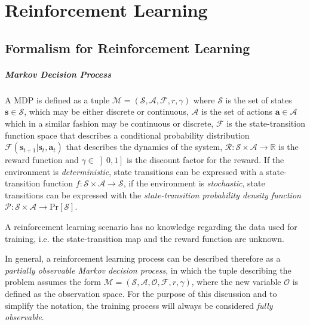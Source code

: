 \chapter{Reinforcement Learning}
\label{chp:04-ReinfLearning}

\section{Formalism for Reinforcement Learning}

\paragraph{Markov Decision Process} A \ac{MDP} is defined as a tuple $\mathcal{M} = (\mathcal{S}, \mathcal{A}, \mathcal{F}, r, \gamma)$ where $\mathcal{S}$ is the set of states $\mathbf{s} \in \mathcal{S}$, which may be either discrete or continuous, $\mathcal{A}$ is the set of actions $\mathbf{a} \in \mathcal{A}$ which in a similar fashion may be continuous or discrete, $\mathcal{F}$ is the state-transition function space that describes a conditional probability distribution $\mathcal{F}(\mathbf{s} _{t+1}|\mathbf{s}_t, \mathbf{a} _t)$ that describes the dynamics of the system, $\mathcal{R} : \mathcal{S} \times \mathcal{A} \rightarrow \mathbb{R}$ is the reward function and $\gamma \in \left]0,1\right]$ is the discount factor for the reward. If the environment is \textit{deterministic}, state transitions can be expressed with a state-transition function $f: \mathcal{S} \times \mathcal{A} \rightarrow \mathcal{S}$, if the environment is \textit{stochastic}, state transitions can be expressed with the \textit{state-transition probability density function} $\mathcal{P}: \mathcal{S} \times \mathcal{A} \rightarrow \mathrm{Pr}[\mathcal{S}]$.



A reinforcement learning scenario has no knowledge regarding the data used for training, i.e. the state-transition map and the reward function are unknown.

In general, a reinforcement learning process can be described therefore as a \textit{partially observable Markov decision process}, in which the tuple describing the problem assumes the form $\mathcal{M} =  (\mathcal{S}, \mathcal{A}, \mathcal{O}, \mathcal{F}, r, \gamma)$, where the new variable $\mathcal{O}$ is defined as the observation space. For the purpose of this discussion and to simplify the notation, the training process will always be considered \textit{fully observable}.

